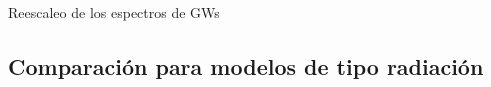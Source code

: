 \documentclass{beamer}
\newcommand{\CosmoLattice}{\ensuremath{\mathcal{C}}\text{osmo}\ensuremath{\mathcal{L}}\text{attice}\xspace}
\begin{document}
\begin{frame}{Reescaleo de los espectros de GWs}
            \end{frame}


        \subsection{Comparación para modelos de tipo radiación}
\end{document}
